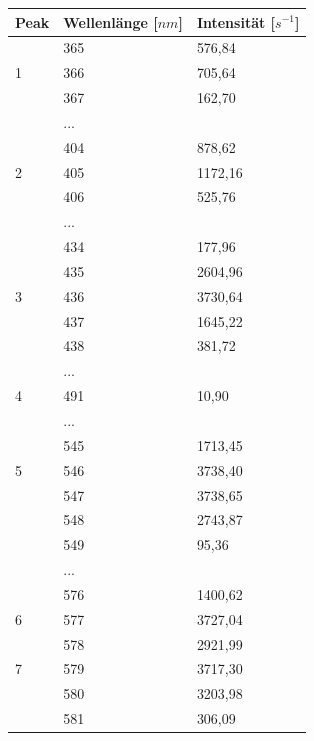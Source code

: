 \documentclass{scrartcl}
\begin{document}
\begin{table}[H]
\begin{center}
\begin{tabular}{l|l|l}
Peak & Wellenlänge [$nm$]    & Intensität [$s^{-1}$] \\
\hline
  & 365 & 576,84 \\
1 & 366 & 705,64 \\
  & 367 & 162,70 \\
  & ...\\
  & 404 & 878,62 \\ 
2 & 405 & 1172,16 \\
  & 406 & 525,76 \\
  & ...\\ 
  & 434 & 177,96 \\ 
  & 435 & 2604,96 \\
3 & 436 & 3730,64 \\
  & 437 & 1645,22 \\
  & 438 & 381,72 \\
  & ...\\
4 & 491 & 10,90 \\
  & ...\\
  & 545 & 1713,45 \\
5 & 546 & 3738,40 \\
  & 547 & 3738,65 \\
  & 548 & 2743,87 \\
  & 549 & 95,36 \\
  & ...\\
  & 576 & 1400,62 \\
6 & 577 & 3727,04 \\
  & 578 & 2921,99 \\
7 & 579 & 3717,30 \\
  & 580 & 3203,98 \\
  & 581 & 306,09 
\end{tabular}
\end{center}
\label{tab:Spektrum2}
\end{table}

\newpage
\end{document}
